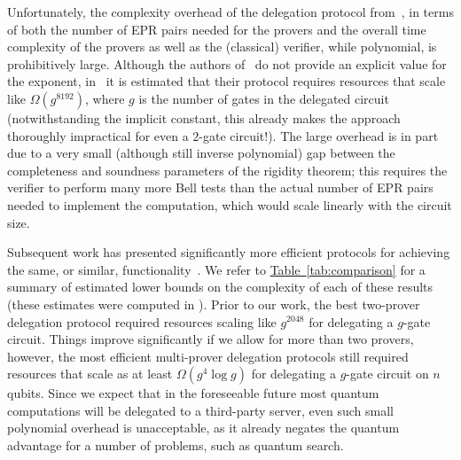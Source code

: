 \documentclass[11pt]{article}
\numberwithin{equation}{section}
\theoremstyle{definition}
\theoremstyle{plain}
\newcommand{\expref}[2]{\hyperref[#2]{#1~\ref{#2}}}
\begin{document}
Unfortunately, the complexity overhead of the delegation protocol from~\cite{reichardt2012classical}, in terms of both the number of EPR pairs needed for the provers and the overall time complexity of the provers as well as the (classical) verifier, while polynomial, is prohibitively large. Although the authors of~\cite{reichardt2012classical} do not provide an explicit value for the exponent, in~\cite{hajdusek2015} it is estimated that their protocol requires resources that scale like $\Omega(g^{8192})$, where $g$ is the number of gates in the delegated circuit (notwithstanding the implicit constant, this already makes the approach thoroughly impractical for even a $2$-gate circuit!).
The large overhead is in part due to a very small (although still inverse polynomial) gap between the completeness and soundness parameters of the rigidity theorem; this requires the verifier to perform many more Bell tests than the actual number of EPR pairs needed to implement the computation, which would scale linearly with the circuit size. 

Subsequent work has presented significantly more efficient protocols for achieving the same, or similar,  functionality~\cite{McKague16,Gheorghiu15,hajdusek2015}. We refer to \expref{Table}{tab:comparison}
for a summary of estimated lower bounds on the complexity of each of these
results (these estimates were computed in \cite{hajdusek2015}). Prior to our
work, the best two-prover delegation protocol required resources scaling like
$g^{2048}$ for delegating a $g$-gate circuit. Things improve significantly if we
allow for more than two provers, however, the most efficient multi-prover
delegation protocols still required resources that scale
as at least $\Omega(g^4\log{g})$ for delegating a $g$-gate circuit on $n$ qubits.
Since we expect that in the foreseeable future most quantum computations will be delegated to a third-party server, even such small polynomial overhead is unacceptable, as it already negates the quantum advantage for a number of problems, such as quantum search.
\end{document}
